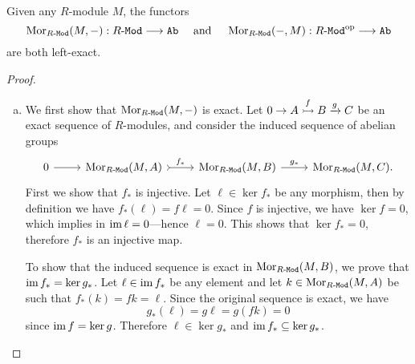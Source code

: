 \begin{proposition}
    \label{prop:hom-functors-left-exact}
    Given any \(R\)-module \(M\), the functors
    \[
        \operatorname{Mor}_{{R\text{-}\texttt{Mod}}}(M, -): {R\text{-}\texttt{Mod}} \longrightarrow {\texttt{Ab}}
        \quad\text{ and }\quad
        \operatorname{Mor}_{{R\text{-}\texttt{Mod}}}(-, M): {R\text{-}\texttt{Mod}}^{\mathrm{op}} \longrightarrow {\texttt{Ab}}
    \]
    are both left-exact.
\end{proposition}

\begin{proof}
    \begin{enumerate}[(a)]\setlength\itemsep{0em}
        \item We first show that \(\operatorname{Mor}_{{R\text{-}\texttt{Mod}}}(M, -)\) is exact. Let
              \(0 \to A \overset{f}{\rightarrowtail} B \xrightarrow g C\) be an exact sequence of
              \(R\)-modules, and consider the induced sequence of abelian groups
              \[
                  \begin{tikzcd}
                      0 \ar[r] &\Hom_{\Mod{R}}(M, A) \ar[r, tail, "f_{*}"] &\Hom_{\Mod{R}}(M, B)
                      \ar[r, "g_{*}"] &\Hom_{\Mod{R}}(M, C).
                  \end{tikzcd}
              \]
              First we show that \(f_{*}\) is injective. Let \(\ell \in \ker f_{*}\) be any
              morphism, then by definition we have \(f_{*}(\ell) = f \ell = 0\). Since \(f\)
              is injective, we have \(\ker f = 0\), which implies in
              \(\operatorname{im} \ell = 0\)---hence \(\ell = 0\). This shows that \(\ker f_{*} = 0\),
              therefore \(f_{*}\) is an injective map.

              To show that the induced sequence is exact in \(\operatorname{Mor}_{{R\text{-}\texttt{Mod}}}(M, B)\), we
              prove that \(\operatorname{im} f_{*} = \ker g_{*}\). Let \(\ell \in \operatorname{im} f_{*}\) be any
              element and let \(k \in \operatorname{Mor}_{{R\text{-}\texttt{Mod}}}(M, A)\) be such that
              \(f_{*}(k) = f k = \ell\). Since the original sequence is exact, we have
              \[
                  g_{*}(\ell) = g \ell = g (f k) = 0
              \]
              since \(\operatorname{im} f = \ker g\). Therefore
              \(\ell \in \ker g_{*}\) and \(\operatorname{im} f_* \subseteq \ker g_{*}\).


\end{enumerate}
\end{proof}
